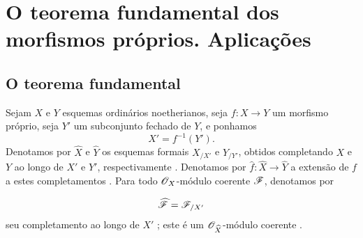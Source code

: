 \section{O teorema fundamental dos morfismos próprios. Aplicações}
\label{section:III.4}


\subsection{O teorema fundamental}
\label{subsection:III.4.1}

\begin{env}[4.1.1]
\label{III.4.1.1}
Sejam $X$ e $Y$ esquemas ordinários noetherianos, seja $f:X\to Y$ um
morfismo próprio, seja $Y'$ um subconjunto fechado de $Y$, e ponhamos
\[
  X'=f^{-1}(Y').
\]
Denotamos por $\widehat{X}$ e $\widehat{Y}$ os esquemas formais
$X_{/X'}$ e $Y_{/Y'}$, obtidos completando $X$ e $Y$ ao longo de
$X'$ e $Y'$, respectivamente .
Denotamos por $\widehat{f}:\widehat{X}\to\widehat{Y}$ a extensão de
$f$ a estes completamentos .
Para todo $\mathscr{O}_X$-módulo coerente $\mathscr{F}$, denotamos por


\[
  \widehat{\mathscr{F}}=\mathscr{F}_{/X'}
\]
seu completamento ao longo de $X'$ ; este é um
$\mathscr{O}_{\widehat{X}}$-módulo coerente .
\end{env}

